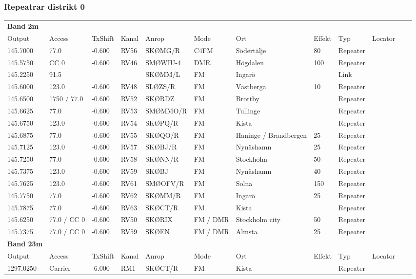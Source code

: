 ﻿\subsubsection{Repeatrar distrikt 0}

\scriptsize
\begin{longtable}[l]{lllllp{1.5cm}lp{1.5cm}lrlr}
\textbf{Band 2m} &  &  &  &  &  &  &  &  &  \\*
Output & Access & TxShift & Kanal & Anrop & Mode & Ort & Effekt & Typ & Locator \\ \hline
145.7000&77.0&-0.600&RV56&SKØMG/R&C4FM&Södertälje&80&Repeater&\\
145.5750&CC 0&-0.600&RV46&SMØWIU-4&DMR&Högdalen&100&Repeater&\\
145.2250&91.5&&&SKØMM/L&FM&Ingarö&&Link&\\
145.6000&123.0&-0.600&RV48&SLØZS/R&FM&Västberga&10&Repeater&\\
145.6500&1750 / 77.0&-0.600&RV52&SKØRDZ&FM&Brottby&&Repeater&\\
145.6625&77.0&-0.600&RV53&SMØMMO/R&FM&Tullinge&&Repeater&\\
145.6750&123.0&-0.600&RV54&SKØPQ/R&FM&Kista&&Repeater&\\
145.6875&77.0&-0.600&RV55&SKØQO/R&FM&Haninge / Brandbergen&25&Repeater&\\
145.7125&123.0&-0.600&RV57&SKØBJ/R&FM&Nynäshamn&25&Repeater&\\
145.7250&77.0&-0.600&RV58&SKØNN/R&FM&Stockholm&50&Repeater&\\
145.7375&123.0&-0.600&RV59&SKØBJ&FM&Nynäshamn&40&Repeater&\\
145.7625&123.0&-0.600&RV61&SMØOFV/R&FM&Solna&150&Repeater&\\
145.7750&77.0&-0.600&RV62&SKØMM/R&FM&Ingarö&25&Repeater&\\
145.7875&77.0&-0.600&RV63&SKØCT/R&FM&Kista&&Repeater&\\
145.6250&77.0 / CC 0&-0.600&RV50&SKØRIX&FM / DMR&Stockholm city&50&Repeater&\\
145.7375&77.0 / CC 0&-0.600&RV59&SKØEN&FM / DMR&Älmsta&25&Repeater&\\


\textbf{Band 23m} &  &  &  &  &  &  &  &  &  \\*

Output & Access & TxShift & Kanal & Anrop & Mode & Ort & Effekt & Typ & Locator \\ \hline
1297.0250&Carrier&-6.000&RM1&SKØCT/R&FM&Kista&&Repeater&\\[0.5pt]


\end{longtable}
